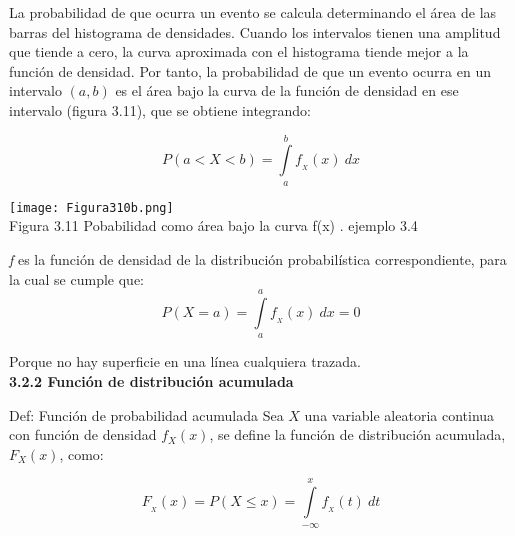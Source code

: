 \documentclass[base=hide,12pt]{elegantbook}
\begin{document}
La probabilidad de que ocurra un evento se calcula determinando el área de las barras del histograma de densidades. Cuando los intervalos tienen una amplitud que tiende a cero, la curva aproximada con el histograma tiende mejor a la función de densidad.  Por tanto, la probabilidad de que un evento ocurra en un intervalo $(a,b)$ es el área bajo la curva de la función de densidad en ese intervalo (figura 3.11), que se obtiene integrando:

\[P(a<X<b)=\int \limits_{a}^{b} f_{_{X}}(x)\:dx \]
%	

	\begin{center}
		\texttt{[image: Figura310b.png]} \\
Figura 3.11 Pobabilidad como área bajo la curva f(x) . ejemplo 3.4 
		\label{fig:311b}
	\end{center}
	
%
%

\emph{f} es la función de densidad de la distribución probabilística correspondiente, para la cual  se cumple que:
\[P(X=a)=\int \limits_{a}^{a}f_{_{X}}(x)\:dx=0\]

Porque no hay superficie en una línea cualquiera trazada.\\

\vspace{1cm}
\textcolor{col4}{\large \bf 3.2.2 Función de distribución acumulada}\\

\begin{Box4}{Def: Función de probabilidad acumulada}
Sea $X$ una variable aleatoria continua con función de densidad $f_{X}(x)$, se define la  función de distribución acumulada, $F_{X}(x)$, como:

$$F_{_X}(x)=P(X\leq x)=\int \limits_{-\infty}^{x}f_{_X}(t)\:dt$$

\end{Box4}
	
\end{document}
